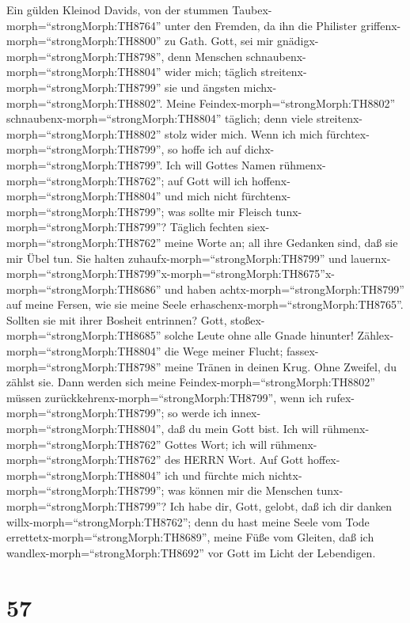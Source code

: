  Ein gülden Kleinod Davids, von der stummen
Taubex-morph=``strongMorph:TH8764'' unter den Fremden, da ihn die
Philister griffenx-morph=``strongMorph:TH8800'' zu Gath. Gott, sei mir
gnädigx-morph=``strongMorph:TH8798'', denn Menschen
schnaubenx-morph=``strongMorph:TH8804'' wider mich; täglich
streitenx-morph=``strongMorph:TH8799'' sie und ängsten
michx-morph=``strongMorph:TH8802''.  Meine
Feindex-morph=``strongMorph:TH8802''
schnaubenx-morph=``strongMorph:TH8804'' täglich; denn viele
streitenx-morph=``strongMorph:TH8802'' stolz wider mich. 
Wenn ich mich fürchtex-morph=``strongMorph:TH8799'', so hoffe ich auf
dichx-morph=``strongMorph:TH8799''.  Ich will Gottes Namen
rühmenx-morph=``strongMorph:TH8762''; auf Gott will ich
hoffenx-morph=``strongMorph:TH8804'' und mich nicht
fürchtenx-morph=``strongMorph:TH8799''; was sollte mir Fleisch
tunx-morph=``strongMorph:TH8799''?  Täglich fechten
siex-morph=``strongMorph:TH8762'' meine Worte an; all ihre Gedanken
sind, daß sie mir Übel tun.  Sie halten
zuhaufx-morph=``strongMorph:TH8799'' und
lauernx-morph=``strongMorph:TH8799''\textbar x-morph=``strongMorph:TH8675''x-morph=``strongMorph:TH8686''
und haben achtx-morph=``strongMorph:TH8799'' auf meine Fersen, wie sie
meine Seele erhaschenx-morph=``strongMorph:TH8765''. 
Sollten sie mit ihrer Bosheit entrinnen? Gott,
stoßex-morph=``strongMorph:TH8685'' solche Leute ohne alle Gnade
hinunter!  Zählex-morph=``strongMorph:TH8804'' die Wege
meiner Flucht; fassex-morph=``strongMorph:TH8798'' meine Tränen in
deinen Krug. Ohne Zweifel, du zählst sie.  Dann werden sich
meine Feindex-morph=``strongMorph:TH8802'' müssen
zurückkehrenx-morph=``strongMorph:TH8799'', wenn ich
rufex-morph=``strongMorph:TH8799''; so werde ich
innex-morph=``strongMorph:TH8804'', daß du mein Gott bist. 
Ich will rühmenx-morph=``strongMorph:TH8762'' Gottes Wort; ich will
rühmenx-morph=``strongMorph:TH8762'' des HERRN Wort.  Auf
Gott hoffex-morph=``strongMorph:TH8804'' ich und fürchte mich
nichtx-morph=``strongMorph:TH8799''; was können mir die Menschen
tunx-morph=``strongMorph:TH8799''?  Ich habe dir, Gott,
gelobt, daß ich dir danken willx-morph=``strongMorph:TH8762'';
 denn du hast meine Seele vom Tode
errettetx-morph=``strongMorph:TH8689'', meine Füße vom Gleiten, daß ich
wandlex-morph=``strongMorph:TH8692'' vor Gott im Licht der Lebendigen.

\hypertarget{section-56}{%
\section{57}\label{section-56}}

